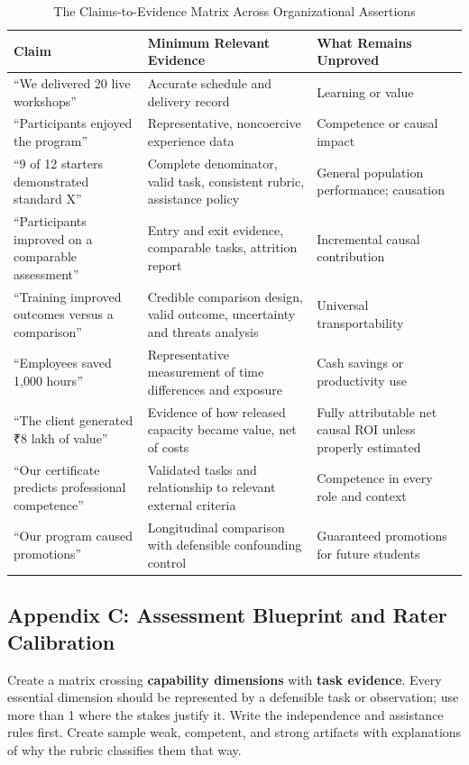 \begin{table}[t]
\centering
\small
\caption{The Claims-to-Evidence Matrix Across Organizational Assertions}
\begin{tabularx}{\textwidth}{p{}p{}X}
\toprule
\textbf{Claim} & \textbf{Minimum Relevant Evidence} & \textbf{What Remains Unproved} \\
\midrule
``We delivered 20 live workshops'' & Accurate schedule and delivery record & Learning or value \\
``Participants enjoyed the program'' & Representative, noncoercive experience data & Competence or causal impact \\
``9 of 12 starters demonstrated standard X'' & Complete denominator, valid task, consistent rubric, assistance policy & General population performance; causation \\
``Participants improved on a comparable assessment'' & Entry and exit evidence, comparable tasks, attrition report & Incremental causal contribution \\
``Training improved outcomes versus a comparison'' & Credible comparison design, valid outcome, uncertainty and threats analysis & Universal transportability \\
``Employees saved 1,000 hours'' & Representative measurement of time differences and exposure & Cash savings or productivity use \\
``The client generated ₹8 lakh of value'' & Evidence of how released capacity became value, net of costs & Fully attributable net causal ROI unless properly estimated \\
``Our certificate predicts professional competence'' & Validated tasks and relationship to relevant external criteria & Competence in every role and context \\
``Our program caused promotions'' & Longitudinal comparison with defensible confounding control & Guaranteed promotions for future students \\
\bottomrule
\end{tabularx}
\end{table}

\subsection*{Appendix C: Assessment Blueprint and Rater Calibration}

Create a matrix crossing \textbf{capability dimensions} with \textbf{task evidence}. Every essential dimension should be represented by a defensible task or observation; use more than 1 where the stakes justify it. Write the independence and assistance rules first. Create sample weak, competent, and strong artifacts with explanations of why the rubric classifies them that way.

